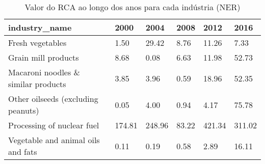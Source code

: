 \begin{table}
\centering
\caption{Valor do RCA ao longo dos anos para cada indústria (NER)}
\begin{tabular}{p{6cm}p{1.5cm}p{1.5cm}p{1.5cm}p{1.5cm}p{1.5cm}}
\toprule
                      industry\_name &   2000 &   2004 &  2008 &   2012 &   2016 \\
\midrule
                   Fresh vegetables &   1.50 &  29.42 &  8.76 &  11.26 &   7.33 \\
                Grain mill products &   8.68 &   0.08 &  6.63 &  11.98 &  52.73 \\
Macaroni noodles \& similar products &   3.85 &   3.96 &  0.59 &  18.96 &  52.35 \\
 Other oilseeds (excluding peanuts) &   0.05 &   4.00 &  0.94 &   4.17 &  75.78 \\
         Processing of nuclear fuel & 174.81 & 248.96 & 83.22 & 421.34 & 311.02 \\
 Vegetable and animal oils and fats &   0.11 &   0.19 &  0.58 &   2.89 &  16.11 \\
\bottomrule
\end{tabular}
\end{table}
